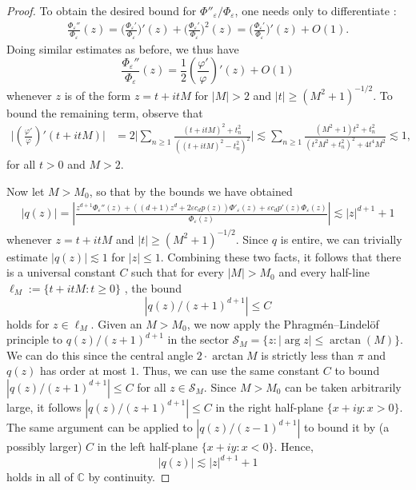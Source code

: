 \documentclass[a4paper,reqno,12pt]{amsart}
\renewcommand{\P}{\Phi}
\renewcommand{\S}{\mathcal{S}}
\newcommand{\cp}{\mathbb{C}} %
\newcommand{\ep}{\varepsilon}
\newcommand{\p}{\varphi}
\begin{document}
\begin{proof}
To obtain the desired bound for $\P''_\ep/ \P_\ep$, one needs only to differentiate :
\begin{align*}
    \frac{\P_\ep''}{\P_\ep}(z)
    = \bigg(\frac{\P_\ep'}{\P_\ep}\bigg)'(z)+ \bigg(\frac{\P_\ep'}{\P_\ep}\bigg)^2(z) = \bigg(\frac{\P_\ep'}{\P_\ep}\bigg)'(z) + O(1).
\end{align*}
Doing similar estimates as before, we thus have
\begin{equation*}
    \frac{\P_\ep''}{\P_\ep}(z)= \frac{1}{2}  \left(\frac{\p'}{\p}\right)' (z) +O(1)
\end{equation*}
whenever $z$ is of the form $z = t + itM$ for $|M| > 2$ and $|t| \geq (M^2 + 1)^{-1/2}$.  To bound the remaining term, observe that
\begin{align*}
    \Bigg|\left(\frac{\p'}{\p}\right)' (t + itM)\Bigg| &= 2 \Bigg|\sum_{n \geq 1} \frac{(t+ itM)^2 + t_n^2}{((t+ itM)^2 - t_n^2)^2} \Bigg|
    \lesssim \sum_{n\geq 1} \frac{(M^2 + 1)t^2 + t_n^2  }{(t^2 M^2 + t_n^2 )^2+ 4t^4 M^2}  \lesssim 1,
\end{align*}
for all $ t > 0 $ and $M > 2$. 

Now let $M > M_0$, so that by the bounds we have obtained 
\begin{align*}
     |q(z)| = \left|\frac{z^{d+1}\P_\ep''(z) + ((d+1)z^d+2\ep c_d p(z))\P'_\ep(z) + \ep c_d p'(z) \P_\ep(z) }{\P_\ep (z)} \right|\lesssim  |z|^{d+1} + 1
\end{align*}
whenever $z = t + itM$ and $|t| \geq (M^2 + 1)^{-1/2}$. Since $q$ is entire, we can trivially estimate $|q(z)| \lesssim 1$ for $|z | \leq 1$. Combining these two facts, it follows that there is a universal constant $C$ such that for every $|M| > M_0$ and every half-line $\ell_M := \{t + itM : t \geq 0\}$ , the bound 
$$|q(z)/(z+1)^{d+1}| \leq C$$
holds for $ z \in \ell_M.$ Given an $M > M_0$, we now apply the Phragmén--Lindelöf principle to $q(z)/(z+1)^{d+1}$ in the sector $\S_M = \{ z : |\arg z| \leq \arctan(M) \}$. We can do this since the central angle $2 \cdot\arctan M$ is strictly less than $\pi$ and $q(z)$ has order at most $1$. Thus, we can use the same constant $C$ to bound $|q(z)/(z+1)^{d+1}| \leq C$ for all $z \in \S_M$. Since $M > M_0$ can be taken arbitrarily large, it follows $|q(z)/(z+1)^{d+1}| \leq C$ in the right half-plane $\{x+iy: x > 0 \}$. The same argument can be applied to $|q(z)/(z-1)^{d+1}|$ to bound it by (a possibly larger) $C$ in the left half-plane $\{x+iy: x < 0 \}$. Hence,
\begin{equation*}
    |q(z)| \lesssim |z|^{d+1} + 1
\end{equation*}
holds in all of $\cp$ by continuity.
\end{proof}
\end{document}
